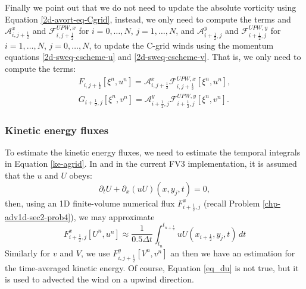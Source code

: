 Finally we point out that we do not need to update the absolute vorticity using Equation \eqref{2d-avort-eq-Cgrid}, instead, 
we only need to compute the terms and  $\mathcal{A}_{i,j+\frac{1}{2}}^{x}$ and $\mathcal{F}_{i,j+\frac{1}{2}}^{UPW,x}$
for $i=0, \ldots, N$, $j=1,\ldots,N$, and $\mathcal{A}_{i+\frac{1}{2},j}^{y}$ and $\mathcal{F}_{i+\frac{1}{2},j}^{UPW,y}$
for $i=1, \ldots, N$, $j=0,\ldots,N$, to update the C-grid winds using
the momentum equations \eqref{2d-sweq-cscheme-u} and \eqref{2d-sweq-cscheme-v}.
That is, we only need to compute the terms:
\begin{align}
F_{i,j+\frac{1}{2}}[\xi^{n}, u^n] = \mathcal{A}_{i,j+\frac{1}{2}}^{x}\mathcal{F}_{i,j+\frac{1}{2}}^{UPW,x}[\xi^{n}, u^n],\\
G_{i+\frac{1}{2},j}[\xi^{n}, v^n] = \mathcal{A}_{i+\frac{1}{2},j}^{y}\mathcal{F}_{i+\frac{1}{2},j}^{UPW,y}[\xi^{n}, v^n].
\end{align}


\subsubsection{Kinetic energy fluxes}
To estimate the kinetic energy fluxes, we need to estimate the temporal integrals in Equation \eqref{ke-agrid}.
In \citet{lin:1997} and in the current FV3 implementation, it is assumed that the $u$ and $U$ obeys:
\begin{equation}
	\label{eq_du}
	{\partial_t U} + {\partial_x (uU)}(x, y_j, t) = 0,
\end{equation}
then, using an 1D finite-volume numerical flux $F_{i+\frac{1}{2},j}^x$ (recall Problem \ref{chp-adv1d-sec2-prob4}), we may approximate 
\begin{equation}
	F_{i+\frac{1}{2},j}^x[U^n,u^n]\approx 
	\frac{1}{0.5\Delta t} \int_{t_{n}}^{t_{n+\frac{1}{2}}} {u}{U}
	(x_{i+\frac{1}{2}}, y_{j}, t) \,dt
\end{equation}
Similarly for $v$ and $V$, we use	$F_{i,j+\frac{1}{2}}^y[V^n,v^n]$ an then we have an estimation for the time-averaged kinetic energy.
Of course, Equation \eqref{eq_du} is not true, but it is used to advected the wind on a upwind direction.

